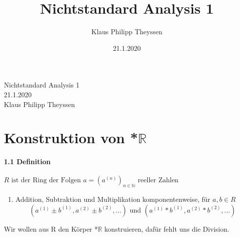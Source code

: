 \documentclass[a4paper]{article}
\title{Nichtstandard Analysis 1}
\date{21.1.2020}
\author{Klaus Philipp Theyssen}
\begin{document}
\begin{center}
      \LARGE Nichtstandard Analysis 1\\
      \normalsize 21.1.2020\\
      Klaus Philipp Theyssen
\end{center}



\section{Konstruktion von *$\mathbb{R}$}
\paragraph{1.1 Definition} $ R \text{ ist der Ring der Folgen }  a = (a^{(n)})_{n \in \mathbb{N}} \text{ reeller Zahlen} $
\begin{enumerate}
      \item Addition, Subtraktion und Multiplikation komponentenweise, für $a, b \in R$  
            $$ (a^{(1)} \pm b^{(1)}, a^{(2)} \pm b^{(2)},...) \text{ und } (a^{(1)} * b^{(1)}, a^{(2)} * b^{(2)},...) $$ 
\end{enumerate}
\smallskip
Wir wollen aus R den Körper *$\mathbb{R}$ konstruieren, dafür fehlt uns die Division. 

\end{document}
